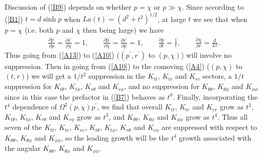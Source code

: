 \documentclass[aps]{revtex4}
\begin{document}
Discussion of (\ref{B9}) depends on whether $p=\chi$ or $p\gg \chi$. Since according to (\ref{B1}) $t=d\sinh p$ when $La(t)=(d^2+t^2)^{1/2}$, at large $t$ we see that  when $p=\chi$ (i.e. both $p$ and $\chi$ then being large) we have 
%
\begin{eqnarray}
\frac{\partial p^{\prime }}{\partial p}=\frac{\partial r^{\prime }}{\partial \chi}=1,\qquad
\frac{\partial p^{\prime }}{\partial \chi}=\frac{\partial r^{\prime }}{\partial p}=1,\qquad \frac{\partial p}{\partial t}=\frac{1}{t},\qquad \frac{\partial \chi}{\partial r}=\frac{d}{Lt}.
\label{B10}
\end{eqnarray}
%
Thus going from (\ref{A13}) to (\ref{A10}) ($(p^{\prime},r^{\prime})$ to $(p,\chi)$) will involve no suppression. Then in going from (\ref{A10}) to the comoving (\ref{A4}) ($(p,\chi)$ to $(t,r)$) we will get a $1/t^2$ suppression in the $K_{tt}$, $K_{tr}$ and $K_{rr}$ sectors, a $1/t$ suppression for $K_{t\theta}$, $K_{t\phi}$, $K_{r\theta}$ and $K_{r\phi}$, and no suppression for $K_{\theta\theta}$, $K_{\theta\phi}$ and $K_{\phi\phi}$ since in this case the prefactor in (\ref{B7}) behaves as $t^0$. Finally, incorporating the $t^4$ dependence of $\Omega^2(p,\chi)p^{\prime}$, we find that overall $K_{tt}$, $K_{tr}$ and $K_{rr}$  grow as $t^2$, $K_{t\theta}$, $K_{t\phi}$, $K_{r\theta}$ and $K_{r\phi}$ grow as $t^3$, and $K_{\theta\theta}$, $K_{\theta\phi}$ and $K_{\phi\phi}$ grow as $t^4$. Thus all seven of the $K_{tt}$, $K_{tr}$, $K_{rr}$, $K_{t\theta}$, $K_{t\phi}$, $K_{r\theta}$ and $K_{r\phi}$ are suppressed with respect to $K_{\theta\theta}$, $K_{\theta\phi}$ and $K_{\phi\phi}$, so the leading growth will be the $t^4$ growth associated with the angular $K_{\theta\theta}$, $K_{\theta\phi}$ and $K_{\phi\phi}$. 
\end{document}
